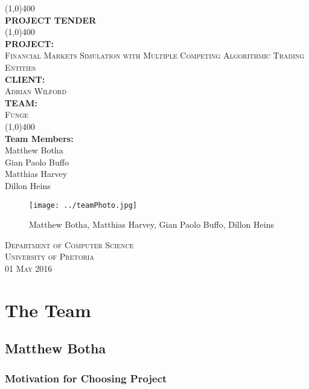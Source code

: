 \documentclass{article}
\begin{document}
\begin{titlepage}
	\begin{center}
		\line(1,0){400}\\
		[6mm]
		\huge{\bfseries PROJECT TENDER}\\
		[2mm]
		\line(1,0){400}\\
		[5mm]
		\large\textbf{PROJECT:}\\\textsc{Financial Markets Simulation with Multiple Competing Algorithmic Trading Entities}\\
		[3mm]
		\large\textbf{CLIENT:}\\\textsc{Adrian Wilford}\\
		[3mm]
		\large \textbf{TEAM:}\\\textsc{Funge}\\
		\line(1,0){400}\\
		[5mm]
		\large \textbf{Team Members:}\\
		[3mm]
		\large Matthew Botha\\
		\large Gian Paolo Buffo\\
		\large Matthias Harvey\\
        \large Dillon Heins\\[3mm]
		\begin{figure}[H]
			\centering
			\texttt{[image: ../teamPhoto.jpg]}
			\caption{Matthew Botha, Matthias Harvey, Gian Paolo Buffo, Dillon Heins}
		\end{figure}
    \end{center}

    \begin{flushright}
        \textsc{\large Department of Computer Science\\
        University of Pretoria\\
        01 May 2016\\}
    \end{flushright}
\end{titlepage}

\section{The Team}
	\subsection{Matthew Botha}
		\subsubsection{Motivation for Choosing Project}
\end{document}
